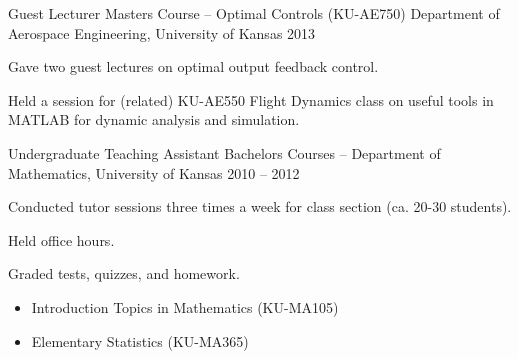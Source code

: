 \begin{cventries}
\cvprojwideentry
  	{Guest Lecturer} %
  	{Masters Course -- Optimal Controls (KU-AE750)} %
    {Department of Aerospace Engineering, University of Kansas} %
    {2013} %
    {
    	  \begin{cvitems} %
        \item Gave two guest lectures on optimal output feedback control. %
		\item Held a session for (related) KU-AE550 Flight Dynamics class on useful tools in MATLAB for dynamic analysis and simulation.
      \end{cvitems}
    } %
    {} %
    {\showprojectdescriptions}
    {}

\cvprojwideentry
  	{Undergraduate Teaching Assistant} %
  	{Bachelors Courses --} %
    {Department of Mathematics, University of Kansas} %
    {2010 – 2012} %
    {
      \begin{cvitems} %
        \item Conducted tutor sessions three times a week for class section (ca. 20-30 students).
		\item Held office hours.
		\item Graded tests, quizzes, and homework.
      \end{cvitems}
    } %
    {} %
    {\showprojectdescriptions}
    {
	  \vspace{-4.0mm}
      \begin{justify}
      \begin{itemize}[leftmargin=2ex, nosep, noitemsep, label={}]
        \setlength{\parskip}{0pt}
     	\item Introduction Topics in Mathematics (KU-MA105)
     	\item Elementary Statistics (KU-MA365)
      \end{itemize}
      \end{justify}
      \vspace{-4.0mm}
    }
\vspace*{-9pt}

\end{cventries}
